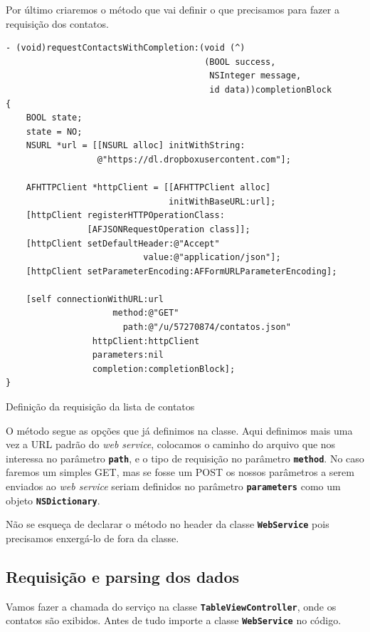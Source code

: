 \documentclass[a4paper,12pt,brazil,doubleside]{book}
\begin{document}
\begin{singlespace}
Por último criaremos o método que vai definir o que precisamos para fazer a requisição dos contatos.

\begin{listing}[H]
\begin{verbatim}
- (void)requestContactsWithCompletion:(void (^)
                                       (BOOL success,
                                        NSInteger message,
                                        id data))completionBlock
{
    BOOL state;
    state = NO;
    NSURL *url = [[NSURL alloc] initWithString:
                  @"https://dl.dropboxusercontent.com"];
    
    AFHTTPClient *httpClient = [[AFHTTPClient alloc]
                                initWithBaseURL:url];
    [httpClient registerHTTPOperationClass:
                [AFJSONRequestOperation class]];
    [httpClient setDefaultHeader:@"Accept"
                           value:@"application/json"];
    [httpClient setParameterEncoding:AFFormURLParameterEncoding];
    
    [self connectionWithURL:url
                     method:@"GET"
                       path:@"/u/57270874/contatos.json"
                 httpClient:httpClient
                 parameters:nil
                 completion:completionBlock];
}
\end{verbatim}
\caption{Definição da requisição da lista de contatos}
\end{listing}


O método segue as opções que já definimos na classe. Aqui definimos mais uma vez a URL padrão do \emph{web service}, colocamos o caminho do arquivo que nos interessa no parâmetro \texttt{\textbf{path}}, e o tipo de requisição no parâmetro \texttt{\textbf{method}}. No caso faremos um simples GET, mas se fosse um POST os nossos parâmetros a serem enviados ao \emph{web service} seriam definidos no parâmetro \texttt{\textbf{parameters}} como um objeto  \texttt{\textbf{NSDictionary}}.

Não se esqueça de declarar o método no header da classe \texttt{\textbf{WebService}} pois precisamos enxergá-lo de fora da classe.

\bigskip

\subsection{Requisição e parsing dos dados}


Vamos fazer a chamada do serviço na classe \texttt{\textbf{TableViewController}}, onde os contatos são exibidos. Antes de tudo importe a classe \texttt{\textbf{WebService}} no código.


\end{singlespace}
\end{document}
